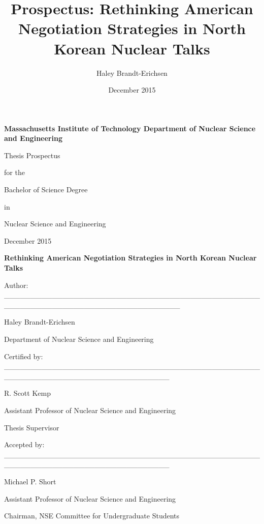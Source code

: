 \documentclass[titlepage]{article}
\title{Prospectus: Rethinking American Negotiation Strategies in North Korean Nuclear Talks}
\author{Haley Brandt-Erichsen}
\date{December 2015}
\begin{document}
\begin{titlepage}
    {\centering
    {\bf \Large Massachusetts Institute of Technology Department of Nuclear Science and Engineering \par}
    \vspace{1.5cm}
    {\large Thesis Prospectus \par for the \par Bachelor of Science Degree \par in \par Nuclear Science and Engineering \par December 2015 \par}
    \vspace{2cm}
    {\bf \LARGE Rethinking American Negotiation Strategies in North Korean Nuclear Talks \par}}
    
    \vfill
    
    {Author: \_\_\_\_\_\_\_\_\_\_\_\_\_\_\_\_\_\_\_\_\_\_\_\_\_\_\_\_\_\_\_\_\_\_\_\_\_\_\_\_\_\_\_\_\_\_\_\_\_\_\_\_\_\_\_\_\_\_\_\_\_\_\_\_\_\_\_\_\_\_\_\_\_\_\_\_\_\_\_\_\_}
    \begin{flushright}
        Haley Brandt-Erichsen \par
        Department of Nuclear Science and Engineering
    \end{flushright}
    \vspace{0.5 cm}
    {Certified by: \_\_\_\_\_\_\_\_\_\_\_\_\_\_\_\_\_\_\_\_\_\_\_\_\_\_\_\_\_\_\_\_\_\_\_\_\_\_\_\_\_\_\_\_\_\_\_\_\_\_\_\_\_\_\_\_\_\_\_\_\_\_\_\_\_\_\_\_\_\_\_\_\_\_\_\_\_\_\_}
    \begin{flushright}
        R. Scott Kemp \par
        Assistant Professor of Nuclear Science and Engineering \par
        Thesis Supervisor
    \end{flushright}
    \vspace{0.5 cm}
    {Accepted by: \_\_\_\_\_\_\_\_\_\_\_\_\_\_\_\_\_\_\_\_\_\_\_\_\_\_\_\_\_\_\_\_\_\_\_\_\_\_\_\_\_\_\_\_\_\_\_\_\_\_\_\_\_\_\_\_\_\_\_\_\_\_\_\_\_\_\_\_\_\_\_\_\_\_\_\_\_\_\_}
    \begin{flushright}
        Michael P. Short \par
        Assistant Professor of Nuclear Science and Engineering \par
        Chairman, NSE Committee for Undergraduate Students
    \end{flushright}
    
    
\end{titlepage}
\end{document}

